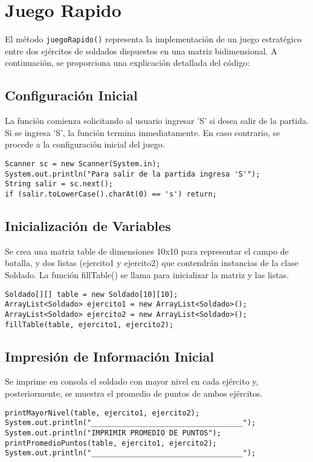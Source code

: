 \section{Juego Rapido}

El método \texttt{juegoRapido()} representa la implementación de un juego estratégico entre dos ejércitos de soldados dispuestos en una matriz bidimensional. A continuación, se proporciona una explicación detallada del código:

\subsection{Configuración Inicial}
La función comienza solicitando al usuario ingresar 'S' si desea salir de la partida.
Si se ingresa 'S', la función termina inmediatamente. En caso contrario, se procede a la configuración inicial del juego.
\begin{lstlisting}
Scanner sc = new Scanner(System.in);
System.out.println("Para salir de la partida ingresa 'S'");
String salir = sc.next();
if (salir.toLowerCase().charAt(0) == 's') return;
\end{lstlisting}

\subsection{Inicialización de Variables}
Se crea una matriz table de dimensiones 10x10 para representar el campo de batalla,
y dos listas (ejercito1 y ejercito2) que contendrán instancias de la clase Soldado.
La función fillTable() se llama para inicializar la matriz y las listas.
\begin{lstlisting}
Soldado[][] table = new Soldado[10][10];
ArrayList<Soldado> ejercito1 = new ArrayList<Soldado>();
ArrayList<Soldado> ejercito2 = new ArrayList<Soldado>();
fillTable(table, ejercito1, ejercito2);
\end{lstlisting}

\subsection{Impresión de Información Inicial}
Se imprime en consola el soldado con mayor nivel en cada ejército y,
posteriormente, se muestra el promedio de puntos de ambos ejércitos.
\begin{lstlisting}
printMayorNivel(table, ejercito1, ejercito2);
System.out.println("___________________________________");
System.out.println("IMPRIMIR PROMEDIO DE PUNTOS");
printPromedioPuntos(table, ejercito1, ejercito2);
System.out.println("___________________________________");
\end{lstlisting}

